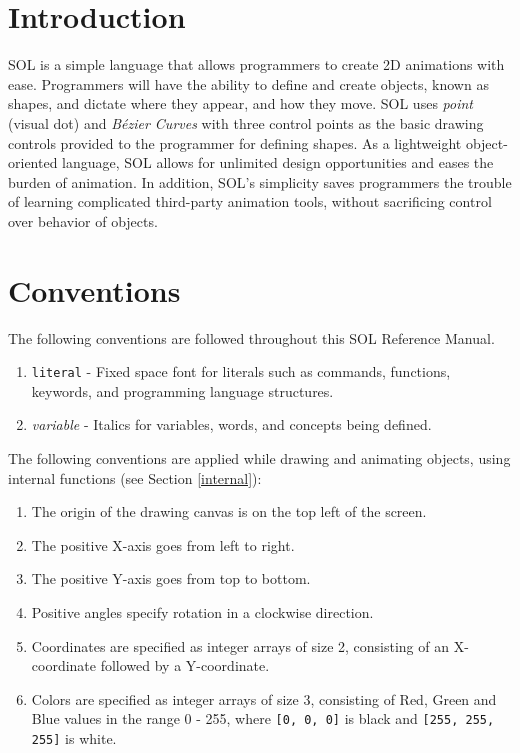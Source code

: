 
\section{Introduction}
SOL is a simple language that allows programmers to create 2D animations with ease. Programmers will have the ability to define and create objects, known as shapes, and dictate where they appear, and how they move. SOL uses \textit{point} (visual dot) and \textit{B\'ezier Curves} with three control points as the basic drawing controls provided to the programmer for defining shapes. As a lightweight object-oriented language, SOL allows for unlimited design opportunities and eases the burden of animation. In addition, SOL’s simplicity saves programmers the trouble of learning complicated third-party animation tools, without sacrificing control over behavior of objects.
\par

\section{Conventions}
    The following conventions are followed throughout this SOL Reference Manual.

    \begin{enumerate}
        \itemsep0em
        \item \texttt{literal} - Fixed space font for literals such as commands, functions,\\
        \hspace*{4.4em} keywords, and programming language structures.
        
        \item \textit{variable} - Italics for variables, words, and concepts being defined.
    \end{enumerate}

    The following conventions are applied while drawing and animating objects, using internal functions (see Section \ref{internal}):

    \begin{enumerate}
        \itemsep0em
        \item The origin of the drawing canvas is on the top left of the screen.
        \item The positive X-axis goes from left to right.
        \item The positive Y-axis goes from top to bottom.
        \item Positive angles specify rotation in a clockwise direction.
        \item Coordinates are specified as integer arrays of size 2, consisting of an X-coordinate followed by a Y-coordinate.
        \item Colors are specified as integer arrays of size 3, consisting of Red, Green and Blue values in the range 0 - 255, where \texttt{[0, 0, 0]} is black and \texttt{[255, 255, 255]} is white.
    \end{enumerate}

